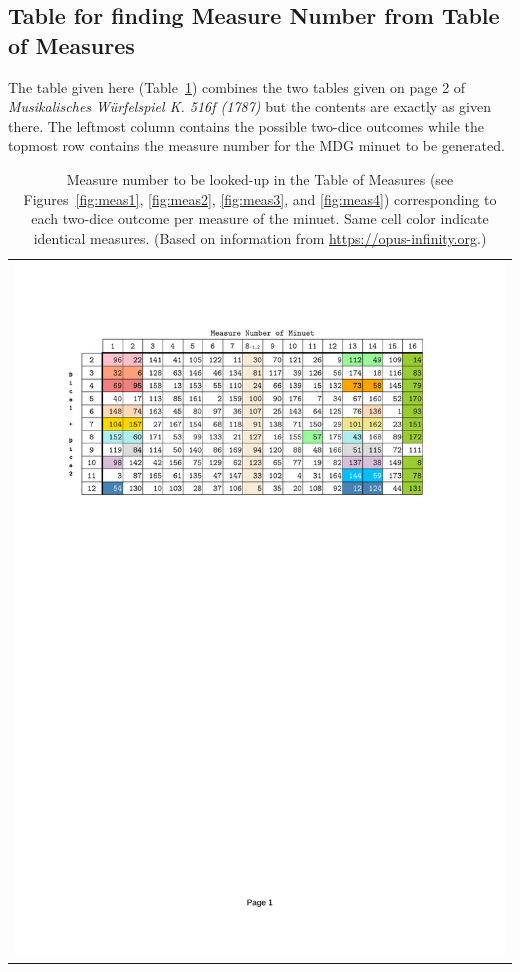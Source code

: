 \documentclass[letterpaper,x11names,svgnames,10pt]{article}
\begin{document}
\subsection{Table for finding Measure Number from Table of Measures}\label{tableFind}
The table given here (Table~\ref{fig:0tab1}) combines the two tables given on page 2 of {\it Musikalisches W\"{u}rfelspiel K. 516f (1787)} but the contents are exactly as given there.  The leftmost column contains the possible two-dice outcomes while the topmost row contains the measure number for the MDG minuet to be generated.

\begin{table}[H]
	\centering
	\begin{tabular}{c}
		\centering
		\includegraphics[clip=true,trim=0.90in 7.75in 1.25in 1.00in,scale=0.90]{12TAB}
	\end{tabular}
	\caption{Measure number to be looked-up in the Table of Measures (see Figures~\ref{fig:meas1}, \ref{fig:meas2}, \ref{fig:meas3}, and \ref{fig:meas4}) corresponding to each two-dice outcome per measure of the minuet. Same cell color indicate identical measures. (Based on information from \href{https://opus-infinity.org/dice_games/mozart_waltz/tables/}{https://opus-infinity.org}.)}
	\label{fig:0tab1}
\end{table}
\end{document}
